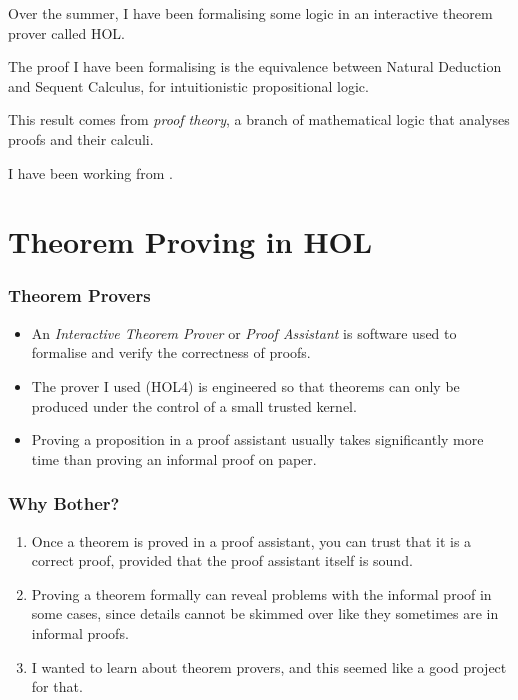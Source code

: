 \documentclass[english,svgnames,hide notes,12pt]{beamer}
\title{\large\presentationtitle}
\author{Alexander Cox\\
		\small Supervised by Michael Norrish\\
		\small The Australian National University
	}
\date{\today}
\theoremstyle{definition}
\theoremstyle{remark}
\begin{document}
\thispagestyle{empty}
\begin{frame}
    \titlepage{}
\end{frame}

\begin{frame}
    Over the summer, I have been formalising some logic in an interactive theorem prover called HOL. 

    \bigskip
    The proof I have been formalising is the equivalence between Natural Deduction and Sequent Calculus, for intuitionistic propositional logic.

    \bigskip
    This result comes from \emph{proof theory}, a branch of mathematical logic that analyses proofs and their calculi.

    \bigskip
    I have been working from .
\end{frame}

\section{Theorem Proving in HOL}

\begin{frame}
    \frametitle{Theorem Provers}
    \begin{itemize}
        \item An \emph{Interactive Theorem Prover} or \emph{Proof Assistant} is software used to formalise and verify the correctness of proofs.
        \item The prover I used (HOL4) is engineered so that theorems can only be produced under the control of a small trusted kernel.
        \item Proving a proposition in a proof assistant usually takes significantly more time than proving an informal proof on paper.
    \end{itemize}
\end{frame}

\begin{frame}
    \frametitle{Why Bother?}
    \begin{enumerate}
        \item Once a theorem is proved in a proof assistant, you can trust that it is a correct proof, provided that the proof assistant itself is sound.
        \item Proving a theorem formally can reveal problems with the informal proof in some cases, since details cannot be skimmed over like they sometimes are in informal proofs.
        \item I wanted to learn about theorem provers, and this seemed like a good project for that.
    \end{enumerate}
\end{frame}
\end{document}
